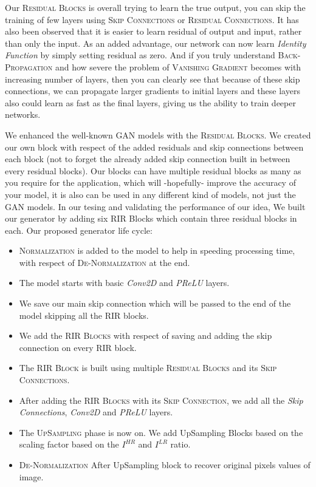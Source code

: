 \documentclass[12pt]{article}
\begin{document}
				Our \textsc{Residual Blocks} is overall trying to learn the true output, you can skip the training of few layers using \textsc{Skip Connections} or \textsc{Residual Connections}. It has also been observed that it is easier to learn residual of output and input, rather than only the input. As an added advantage, our network can now learn \textit{Identity Function} by simply setting residual as zero. And if you truly understand \textsc{Back-Propagation} and how severe the problem of \textsc{Vanishing Gradient} becomes with increasing number of layers, then you can clearly see that because of these skip connections, we can propagate larger gradients to initial layers and these layers also could learn as fast as the final layers, giving us the ability to train deeper networks.
					
				We enhanced the well-known GAN models with the \textsc{Residual Blocks}. We created our own block with respect of the added residuals and skip connections between each block (not to forget the already added skip connection built in between every residual blocks). Our blocks can have multiple residual blocks as many as you require for the application, which will -hopefully- improve the accuracy of your model, it is also can be used in any different kind of models, not just the GAN models. In our tesing and validating the performance of our idea, We built our generator by adding six RIR Blocks which contain three residual blocks in each. Our proposed generator life cycle:
				\begin{itemize}
					\item \textsc{Normalization} is added to the model to help in speeding processing time, with respect of \textsc{De-Normalization} at the end.
					\item The model starts with basic \textit{Conv2D} and \textit{PReLU} layers.
					\item We save our main skip connection which will be passed to the end of the model skipping all the RIR blocks.
					\item We add the \textsc{RIR Blocks} with respect of saving and adding the skip connection on every RIR block.
					\item The \textsc{RIR Block} is built using multiple \textsc{Residual Blocks} and its \textsc{Skip Connections}.
					\item After adding the \textsc{RIR Blocks} with its \textsc{Skip Connection}, we add all the \textit{Skip Connections}, \textit{Conv2D} and \textit{PReLU} layers.
					\item The \textsc{UpSampling} phase is now on. We add UpSampling Blocks based on the scaling factor based on the $I^{HR}$ and $I^{LR}$ ratio.
					\item \textsc{De-Normalization} After UpSampling block to recover original pixels values of image.
				\end{itemize}
\end{document}
